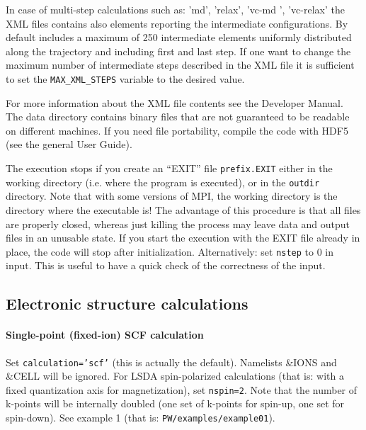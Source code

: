 \documentclass[12pt,a4paper]{article}
\def\ttquote{\textsf{'}}
\begin{document}
In case of multi-step calculations such as: {\ttfamily \ttquote md\ttquote, \ttquote relax\ttquote, 
\ttquote vc-md \ttquote, \ttquote vc-relax\ttquote} the XML files contains also elements reporting the intermediate 
configurations. By default includes a maximum of 250 intermediate elements uniformly distributed along the trajectory 
and including first and last step. If one want to change the maximum number of intermediate steps described in the 
XML file it is sufficient to set the \texttt{MAX\_XML\_STEPS} variable to the desired  value.  

For more information about the XML file contents see  the Developer Manual. The data directory contains
binary files that are not guaranteed to be readable on different machines.
If you need file portability, compile the code with HDF5 (see the general
User Guide).

The execution stops if you create an ``EXIT'' file \texttt{prefix.EXIT} either
in the working directory (i.e. where the program is executed), or in
the  \texttt{outdir} directory. Note that with some versions of MPI,
the working directory  is the directory where the executable is! 
The advantage of this procedure is that all files are properly closed, 
whereas  just killing the process may leave data and output files in 
an unusable state. If you start the execution with the EXIT file already
in place, the code will stop after initialization. Alternatively:
set \texttt{nstep} to 0 in input. This is useful to have
a quick check of the correctness of the input. 

\subsection{Electronic structure calculations}
\paragraph{Single-point (fixed-ion) SCF calculation} 
Set \texttt{calculation='scf'} (this is actually the default).
Namelists \&IONS and \&CELL will be ignored. For LSDA spin-polarized 
calculations (that is: with a fixed quantization axis for magnetization),
set \texttt{nspin=2}. Note that the number of k-points will be internally
doubled (one set of k-points for spin-up, one set for spin-down).
See example 1 (that is: \texttt{PW/examples/example01}).
\end{document}
